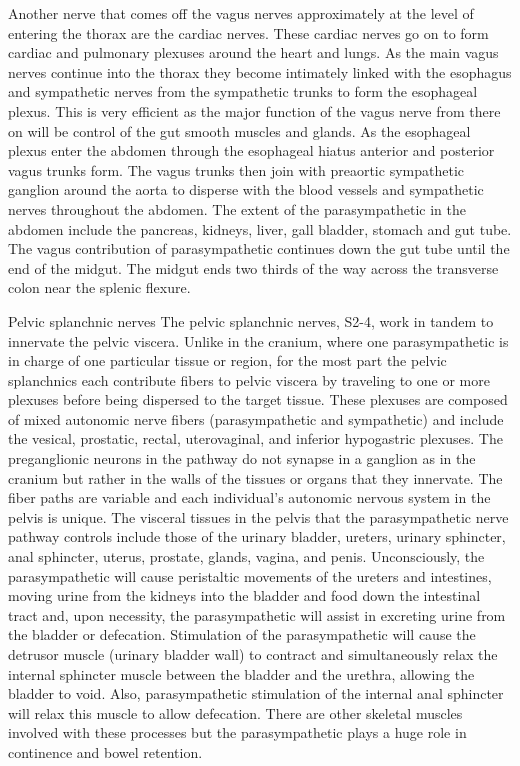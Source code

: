 Another nerve that comes off the vagus nerves approximately at the level of entering the thorax are the cardiac nerves. These cardiac nerves go on to form cardiac and pulmonary plexuses around the heart and lungs. As the main vagus nerves continue into the thorax they become intimately linked with the esophagus and sympathetic nerves from the sympathetic trunks to form the esophageal plexus. This is very efficient as the major function of the vagus nerve from there on will be control of the gut smooth muscles and glands. As the esophageal plexus enter the abdomen through the esophageal hiatus anterior and posterior vagus trunks form. The vagus trunks then join with preaortic sympathetic ganglion around the aorta to disperse with the blood vessels and sympathetic nerves throughout the abdomen. The extent of the parasympathetic in the abdomen include the pancreas, kidneys, liver, gall bladder, stomach and gut tube. The vagus contribution of parasympathetic continues down the gut tube until the end of the midgut. The midgut ends two thirds of the way across the transverse colon near the splenic flexure.

Pelvic splanchnic nerves
The pelvic splanchnic nerves, S2-4, work in tandem to innervate the pelvic viscera. Unlike in the cranium, where one parasympathetic is in charge of one particular tissue or region, for the most part the pelvic splanchnics each contribute fibers to pelvic viscera by traveling to one or more plexuses before being dispersed to the target tissue. These plexuses are composed of mixed autonomic nerve fibers (parasympathetic and sympathetic) and include the vesical, prostatic, rectal, uterovaginal, and inferior hypogastric plexuses. The preganglionic neurons in the pathway do not synapse in a ganglion as in the cranium but rather in the walls of the tissues or organs that they innervate. The fiber paths are variable and each individual's autonomic nervous system in the pelvis is unique. The visceral tissues in the pelvis that the parasympathetic nerve pathway controls include those of the urinary bladder, ureters, urinary sphincter, anal sphincter, uterus, prostate, glands, vagina, and penis. Unconsciously, the parasympathetic will cause peristaltic movements of the ureters and intestines, moving urine from the kidneys into the bladder and food down the intestinal tract and, upon necessity, the parasympathetic will assist in excreting urine from the bladder or defecation. Stimulation of the parasympathetic will cause the detrusor muscle (urinary bladder wall) to contract and simultaneously relax the internal sphincter muscle between the bladder and the urethra, allowing the bladder to void. Also, parasympathetic stimulation of the internal anal sphincter will relax this muscle to allow defecation. There are other skeletal muscles involved with these processes but the parasympathetic plays a huge role in continence and bowel retention.


